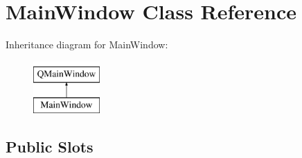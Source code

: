 \section{Main\+Window Class Reference}
\label{class_main_window}
Inheritance diagram for Main\+Window\+:\begin{figure}[H]
\begin{center}
\leavevmode
\includegraphics[height=2.000000cm]{class_main_window}
\end{center}
\end{figure}
\subsection*{Public Slots}
